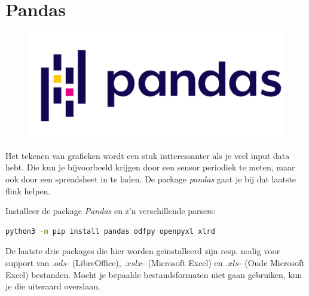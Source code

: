 \newpage

\section{Pandas}
\begin{figure}[h!]
\centering\includegraphics[scale=0.2]{Pictures/chapter07/pandas_logo.png}
\label{fig:pandaslogo} %
\end{figure}

Het tekenen van grafieken wordt een stuk intteressanter als je veel input data hebt. Die kun je bijvoorbeeld krijgen door een sensor periodiek te meten, maar ook door een spreadsheet in te laden. De package \textit{pandas} gaat je bij dat laatste flink helpen.

\begin{exercise}
Installeer de package \textit{Pandas} en z'n verschillende parsers:
\begin{lstlisting}[language=bash]
python3 -m pip install pandas odfpy openpyxl xlrd
\end{lstlisting}
De laatste drie packages die hier worden geïnstalleerd zijn resp. nodig voor support van $.ods$- (LibreOffice), $.xslx$- (Microsoft Excel) en $.xls$- (Oude Microsoft Excel) bestanden. Mocht je bepaalde bestandsformaten niet gaan gebruiken, kun je die uiteraard overslaan.
\end{exercise}


